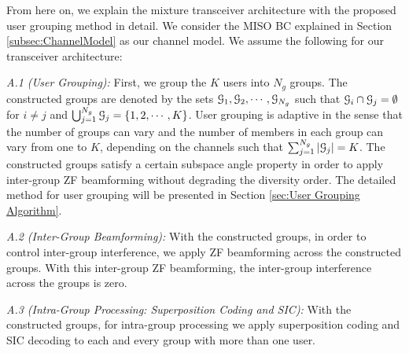 \documentclass[11pt, draft, onecolumn ]{IEEEtran}
\begin{document}
From here on, we explain the {}{mixture transceiver architecture with the proposed user grouping method} in detail. We consider the MISO BC explained in Section \ref{subsec:ChannelModel} as our channel model.   We assume the following for our transceiver architecture:




{\em A.1 (User Grouping):} First, we group the $K$ users into $N_g$ groups. The constructed groups are denoted by the sets ${\cal G}_1, {\cal G}_2,\cdots, {\cal G}_{N_g}$ such that ${\cal G}_i \cap {\cal G}_j = \emptyset$ for $i\ne j$ and $\bigcup_{j=1}^{N_g} {\cal G}_j = \{1,2,\cdots,K\}$.
User grouping is adaptive in the sense that the number of groups can vary and the number of  members in each group can vary from one to $K$, depending on the channels such that $\sum_{j=1}^{N_g} |{\cal G}_j|=K$.  The constructed groups satisfy a certain subspace angle property in order to apply inter-group ZF beamforming without degrading the diversity order.
The detailed method for user grouping will be presented in Section \ref{sec:User Grouping Algorithm}.



{\em A.2 (Inter-Group Beamforming):} With the constructed groups,  in order to control inter-group interference,
we apply ZF beamforming across the constructed groups. With this inter-group ZF beamforming,
the inter-group interference across the groups is zero.

{\em A.3 (Intra-Group Processing: Superposition Coding and SIC):}
With the constructed groups, for intra-group processing we apply superposition  coding and SIC decoding
to each and every group with more than one user.
\end{document}
